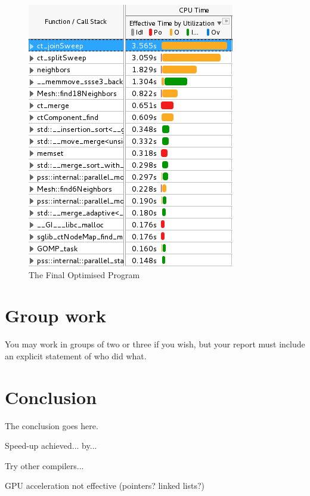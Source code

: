 \documentclass[conference]{IEEEtran}
\begin{document}
\begin{figure}[!h]
	\centering
	\includegraphics[width=\columnwidth]{opt_vtune}
	\caption{The Final Optimised Program}
	\label{fig:opt}
\end{figure}


\section{Group work}

You may work in groups of two or three if you wish, but your report must include an explicit statement of who did what.

\section{Conclusion}
The conclusion goes here.

Speed-up achieved... by...

Try other compilers...

GPU acceleration not effective (pointers? linked lists?)
\end{document}

